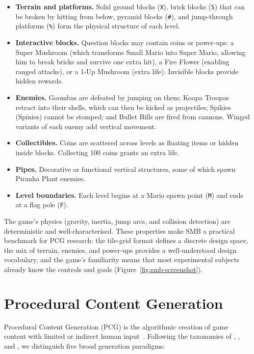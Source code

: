 \documentclass[shortabstract, mgr, english]{iithesis}
\begin{document}
\begin{itemize}[nosep]
  \item \textbf{Terrain and platforms.} Solid ground blocks (\texttt{X}), brick blocks
        (\texttt{S}) that can be broken by hitting from below, pyramid blocks
        (\texttt{\#}), and jump-through platforms (\texttt{\%}) form the physical
        structure of each level.
  \item \textbf{Interactive blocks.} Question blocks may contain coins or power-ups:
        a Super Mushroom (which transforms Small Mario into Super Mario, allowing him
        to break bricks and survive one extra hit), a Fire Flower (enabling ranged
        attacks), or a 1-Up Mushroom (extra life). Invisible blocks provide hidden
        rewards.
  \item \textbf{Enemies.} Goombas are defeated by jumping on them; Koopa Troopas
        retract into their shells, which can then be kicked as projectiles; Spikies
        (Spinies) cannot be stomped; and Bullet Bills are fired from cannons. Winged
        variants of each enemy add vertical movement.
  \item \textbf{Collectibles.} Coins are scattered across levels as floating items or
        hidden inside blocks. Collecting 100 coins grants an extra life.
  \item \textbf{Pipes.} Decorative or functional vertical structures, some of which
        spawn Piranha Plant enemies.
  \item \textbf{Level boundaries.} Each level begins at a Mario spawn point
        (\texttt{M}) and ends at a flag pole (\texttt{F}).
\end{itemize}

The game's physics (gravity, inertia, jump arcs, and collision detection) are
deterministic and well-characterised. These properties make SMB a practical benchmark
for PCG research: the tile-grid format defines a discrete design space,
the mix of terrain, enemies, and power-ups provides a well-understood design vocabulary, and the game's familiarity means that
most experimental subjects already know the controls and goals
(Figure~\ref{fig:smb-screenshot}).

\section{Procedural Content Generation}
\label{sec:bg-pcg}

Procedural Content Generation (PCG) is the algorithmic creation of game content
with limited or indirect human input~\citep{togelius2011search, shaker2016pcgbook}. Following the
taxonomies of \citet{togelius2011search}, \citet{shaker2016pcgbook}, and \citet{summerville2018pcgml},
we distinguish five broad generation paradigms:
\end{document}
